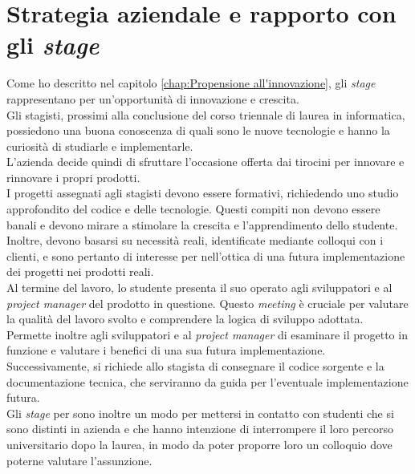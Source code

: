 \section{Strategia aziendale e rapporto con gli \textit{stage}}\label{chap:strategia}
Come ho descritto nel capitolo \ref{chap:Propensione all'innovazione}, gli \textit{stage} rappresentano per {\company} 
un'opportunità di innovazione e crescita.\\
Gli stagisti, prossimi alla conclusione del corso triennale di laurea in informatica, 
possiedono una buona conoscenza di quali sono le nuove tecnologie e hanno la curiosità di studiarle e implementarle.\\
L'azienda decide quindi di sfruttare l'occasione offerta dai tirocini per innovare e rinnovare i propri prodotti.\\
I progetti assegnati agli stagisti devono essere formativi, richiedendo uno studio approfondito del codice e delle tecnologie. 
Questi compiti non devono essere banali e devono mirare a stimolare la crescita e l'apprendimento dello studente. 
Inoltre, devono basarsi su necessità reali, identificate mediante colloqui con i clienti, e sono pertanto di interesse per 
{\company} nell'ottica di una futura implementazione dei progetti nei prodotti reali.\\
Al termine del lavoro, lo studente presenta il suo operato agli sviluppatori e al \textit{project manager} del prodotto 
in questione. Questo \textit{meeting} è cruciale per valutare la qualità del lavoro svolto e comprendere la logica di 
sviluppo adottata. Permette inoltre agli sviluppatori e al \textit{project manager} di esaminare il progetto in funzione e 
valutare i benefici di una sua futura implementazione.\\
Successivamente, si richiede allo stagista di consegnare il codice sorgente e la documentazione tecnica, che serviranno 
da guida per l'eventuale implementazione futura.\\
Gli \textit{stage} per {\company} sono inoltre un modo per mettersi in contatto con studenti che si sono distinti in azienda 
e che hanno intenzione di interrompere il loro percorso universitario dopo la laurea, in modo da poter proporre loro un colloquio 
dove poterne valutare l'assunzione.